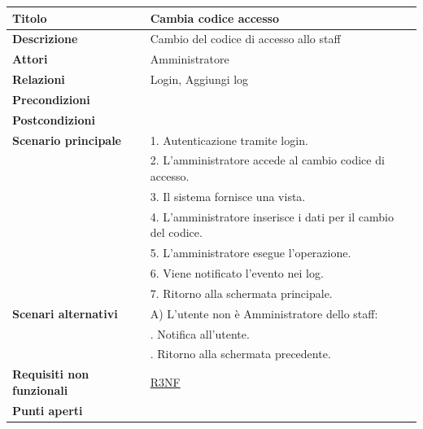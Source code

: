 \documentclass[a4paper]{article}
\begin{document}


  \begin{center}
    \begin{tabularx}{1\textwidth}{l|X}
        \textbf{Titolo} & Cambia codice accesso \\
        \hline
        \textbf{Descrizione} & Cambio del codice di accesso allo staff \\
        \hline
        \textbf{Attori} & Amministratore \\
        \hline
        \textbf{Relazioni} & Login, Aggiungi log \\
        \hline
        \textbf{Precondizioni} &  \\
        \hline
        \textbf{Postcondizioni} &  \\
        \hline
        \textbf{Scenario principale} & 1. Autenticazione tramite login. \\
                                     & 2. L'amministratore accede al cambio codice di accesso. \\
                                     & 3. Il sistema fornisce una vista. \\
                                     & 4. L'amministratore inserisce i dati per il cambio del codice. \\
                                     & 5. L'amministratore esegue l'operazione.\\
                                     & 6. Viene notificato l'evento nei log.\\
                                     & 7. Ritorno alla schermata principale.\\
        \hline
        \textbf{Scenari alternativi} & A) L'utente non è Amministratore dello staff: \\
                                     & \quad 1. Notifica all'utente. \\
                                     & \quad 2. Ritorno alla schermata precedente. \\
        \hline
        \textbf{Requisiti non funzionali} & \hyperlink{R3NF}{R3NF} \\
        \hline
        \textbf{Punti aperti} & \\
        \hline
    \end{tabularx}
  \end{center}


\end{document}
